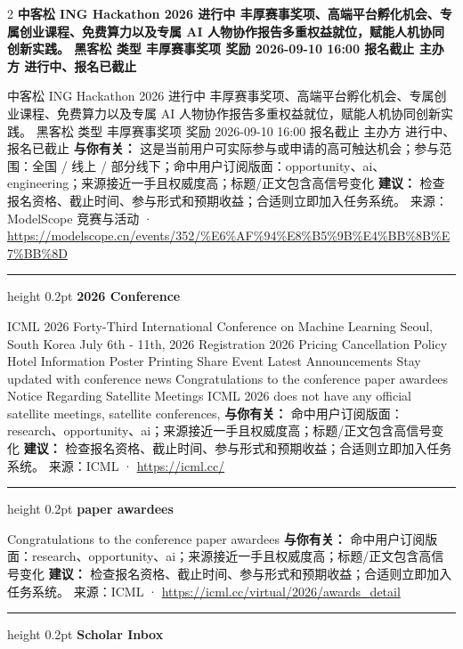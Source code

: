 \documentclass[10.5pt]{ctexart}
\begin{document}
\begin{multicols}{2}
{\large\bfseries 中客松 ING Hackathon 2026 进行中 丰厚赛事奖项、高端平台孵化机会、专属创业课程、免费算力以及专属 AI 人物协作报告多重权益就位，赋能人机协同创新实践。 黑客松 类型 丰厚赛事奖项 奖励 2026-09-10 16:00 报名截止 主办方 进行中、报名已截止}\par
中客松 ING Hackathon 2026 进行中 丰厚赛事奖项、高端平台孵化机会、专属创业课程、免费算力以及专属 AI 人物协作报告多重权益就位，赋能人机协同创新实践。 黑客松 类型 丰厚赛事奖项 奖励 2026-09-10 16:00 报名截止 主办方 进行中、报名已截止
\textbf{与你有关：} 这是当前用户可实际参与或申请的高可触达机会；参与范围：全国 / 线上 / 部分线下；命中用户订阅版面：opportunity、ai、engineering；来源接近一手且权威度高；标题/正文包含高信号变化
\textbf{建议：} 检查报名资格、截止时间、参与形式和预期收益；合适则立即加入任务系统。
{\footnotesize\color{ormuted} 来源：ModelScope 竞赛与活动 · \url{https://modelscope.cn/events/352/%E6%AF%94%E8%B5%9B%E4%BB%8B%E7%BB%8D}}
\vspace{2mm}
\hrule height 0.2pt
\vspace{2mm}
{\large\bfseries 2026 Conference}\par
ICML 2026 Forty-Third International Conference on Machine Learning Seoul, South Korea July 6th - 11th, 2026 Registration 2026 Pricing Cancellation Policy Hotel Information Poster Printing Share Event Latest Announcements Stay updated with conference news Congratulations to the conference paper awardees Notice Regarding Satellite Meetings ICML 2026 does not have any official satellite meetings, satellite conferences, 
\textbf{与你有关：} 命中用户订阅版面：research、opportunity、ai；来源接近一手且权威度高；标题/正文包含高信号变化
\textbf{建议：} 检查报名资格、截止时间、参与形式和预期收益；合适则立即加入任务系统。
{\footnotesize\color{ormuted} 来源：ICML · \url{https://icml.cc/}}
\vspace{2mm}
\hrule height 0.2pt
\vspace{2mm}
{\large\bfseries paper awardees}\par
Congratulations to the conference paper awardees
\textbf{与你有关：} 命中用户订阅版面：research、opportunity、ai；来源接近一手且权威度高；标题/正文包含高信号变化
\textbf{建议：} 检查报名资格、截止时间、参与形式和预期收益；合适则立即加入任务系统。
{\footnotesize\color{ormuted} 来源：ICML · \url{https://icml.cc/virtual/2026/awards_detail}}
\vspace{2mm}
\hrule height 0.2pt
\vspace{2mm}
{\large\bfseries Scholar Inbox}\par

\end{multicols}
\end{document}
